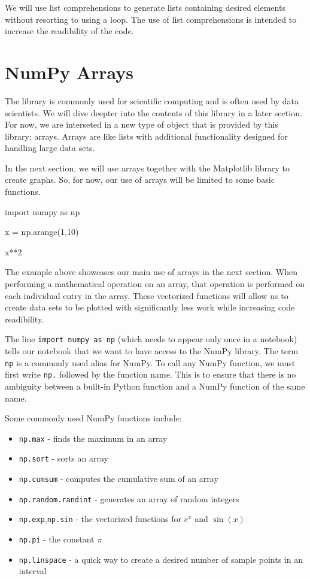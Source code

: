 \documentclass{ximera}
\begin{document}
We will use list comprehensions to generate lists containing desired elements without resorting to using a loop. The use of list comprehensions is intended to increase the readibility of the code.

\section{NumPy Arrays}

The  library is commonly used for scientific computing and is often used by data scientists. We will dive deepter into the contents of this library in a later section. For now, we are interseted in a new type of object that is provided by this library: arrays. Arrays are like lists with additional functionality designed for handling large data sets. 

In the next section, we will use arrays together with the Matplotlib library to create graphs. So, for now, our use of arrays will be limited to some basic functions.

\begin{sageCell}
import numpy as np

x = np.arange(1,10)

x**2
\end{sageCell}

The example above showcases our main use of arrays in the next section. When performing a mathematical operation on an array, that operation is performed on each individual entry in the array. These vectorized functions will allow us to create data sets to be plotted with significantly less work while increasing code readibility.

The line \verb|import numpy as np| (which needs to appear only once in a notebook) tells our notebook that we want to have access to the NumPy library. The term \verb|np| is a commonly used alias for NumPy. To call any NumPy function, we must first write \verb|np.| followed by the function name. This is to ensure that there is no ambiguity between a built-in Python function and a NumPy function of the same name.

Some commonly used NumPy functions include:

\begin{itemize}
	\item \verb|np.max| - finds the maximum in an array
	\item \verb|np.sort| - sorts an array
	\item \verb|np.cumsum| - computes the cumulative sum of an array
	\item \verb|np.random.randint| - generates an array of random integers
	\item \verb|np.exp|,\verb|np.sin| - the vectorized functions for $e^x$ and $\sin(x)$
	\item \verb|np.pi| - the constant $\pi$
	\item \verb|np.linspace| - a quick way to create a desired number of sample points in an interval
\end{itemize}
\end{document}
